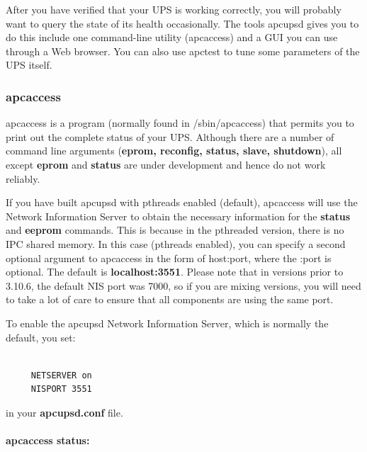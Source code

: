{{{{\label{index-Monitoring-109}
\label{index-Tuning-110}
After you have verified that your UPS is working correctly, you will probably
want to query the state of its health occasionally. The tools apcupsd gives
you to do this include one command-line utility (apcaccess) and a GUI you can
use through a Web browser.  You can also use apctest to tune some parameters
of the UPS itself. 

\label{apcaccess}

\subsubsection*{apcaccess}

\label{index-apcaccess-111}
apcaccess is a program (normally found in /sbin/apcaccess) that permits you to
print out the complete status of your UPS. Although there are a number of
command line arguments ({\bf eprom, reconfig, status, slave, shutdown}), all
except {\bf eprom} and {\bf status} are under development and hence do not
work reliably.  

If you have built apcupsd with pthreads enabled (default), apcaccess will use
the Network Information Server to obtain the necessary information for the
{\bf status} and {\bf eeprom} commands. This is because in the pthreaded
version, there is no IPC shared memory. In this case (pthreads enabled), you
can specify a second optional argument to apcaccess in the form of host:port,
where the :port is optional. The default is {\bf localhost:3551}. Please note
that in versions prior to 3.10.6, the default NIS port was 7000, so if you are
mixing versions, you will need to take a lot of care to ensure that all
components are using the same port.  

To enable the apcupsd Network Information Server, which is normally the
default, you set: 

\footnotesize
\begin{verbatim}
     
     NETSERVER on
     NISPORT 3551
\end{verbatim}
\normalsize

in your {\bf apcupsd.conf} file. 

\label{apcaccess-status}

\paragraph*{apcaccess status:}

}}}}
